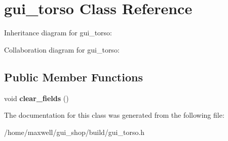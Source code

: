 \hypertarget{classgui__torso}{}\section{gui\+\_\+torso Class Reference}
\label{classgui__torso}


Inheritance diagram for gui\+\_\+torso\+:


Collaboration diagram for gui\+\_\+torso\+:
\subsection*{Public Member Functions}
\begin{DoxyCompactItemize}
\item 
void {\bfseries clear\+\_\+fields} ()\hypertarget{classgui__torso_a080b7ad54ff5b6554a07c99fce70d86a}{}\label{classgui__torso_a080b7ad54ff5b6554a07c99fce70d86a}

\end{DoxyCompactItemize}


The documentation for this class was generated from the following file\+:\begin{DoxyCompactItemize}
\item 
/home/maxwell/gui\+\_\+shop/build/gui\+\_\+torso.\+h\end{DoxyCompactItemize}
